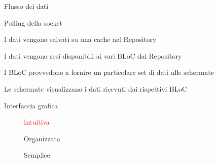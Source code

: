 \documentclass[12pt,italian,oneside]{report}
\newcommand{\rosso}[1]{\textcolor{red}{#1}}
\begin{document}
\begin{firstheadlineitemize}

\item Flusso dei dati
\begin{secondheadlineitemize}
	\item Polling della socket
	\item I dati vengono salvati su una cache nel Repository
	\item I dati vengono resi disponibili ai vari BLoC dal Repository
	\item I BLoC provvedono a fornire un particolare set di dati alle schermate
	\item Le schermate visualizzano i dati ricevuti dai rispettivi BLoC
\end{secondheadlineitemize}

\newpage

\item Interfaccia grafica

\begin{figure}[htp]
\centering
\hfill
\begin{minipage}[b]{.3\columnwidth}
\centering
  \begin{secondheadlineitemize}

\item \rosso{Intuitiva}
\item Organizzata
\item Semplice


\end{secondheadlineitemize}
\end{minipage}
\end{figure}
\end{firstheadlineitemize}
\end{document}
